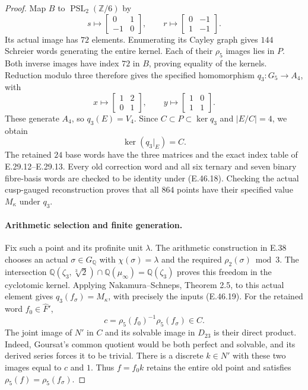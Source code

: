 \begin{proof}
Map $B$ to $\operatorname{PSL}_2(\mathbb Z/6)$ by
\[
 s\longmapsto\begin{bmatrix}0&1\\-1&0\end{bmatrix},\qquad
 r\longmapsto\begin{bmatrix}0&-1\\1&-1\end{bmatrix}.
 \tag{E.46.18}
\]
Its actual image has $72$ elements.  Enumerating its Cayley
graph gives $144$ Schreier words generating the entire kernel.
Each of their $\rho_5$ images lies in $P$.
Both inverse images have index $72$ in $B$, proving equality
of the kernels.  Reduction modulo three therefore gives
the specified homomorphism $q_3:G_5\to A_4$, with
\[
 x\longmapsto\begin{bmatrix}1&2\\0&1\end{bmatrix},\qquad
 y\longmapsto\begin{bmatrix}1&0\\1&1\end{bmatrix}.
 \tag{E.46.19}
\]
These generate $A_4$, so $q_3(E)=V_4$.  Since
$C\subset P\subset\ker q_3$ and $|E/C|=4$, we obtain
\[
                         \ker(q_3|_E)=C.
 \tag{E.46.20}
\]
The retained $24$ base words have the three matrices and
the exact index table of E.29.12--E.29.13.
Every old correction word and all six ternary and seven
binary fibre-basis words are checked to be identity under
\textup{(E.46.18)}.  Checking the actual cusp-gauged
reconstruction proves that all $864$ points have their
specified value $M_\kappa$ under $q_3$.

\paragraph{Arithmetic selection and finite generation.}
Fix such a point and its profinite unit $\lambda$.
The arithmetic construction in E.38 chooses an actual
$\sigma\in G_{\mathbb Q}$ with $\chi(\sigma)=\lambda$
and the required $\rho_2(\sigma)\bmod3$.
The intersection
$\mathbb Q(\zeta_3,\sqrt[3]{2})\cap\mathbb Q(\mu_\infty)
=\mathbb Q(\zeta_3)$ proves this freedom in the cyclotomic
kernel.  Applying Nakamura--Schneps, Theorem 2.5,
to this actual element gives $q_3(f_\sigma)=M_\kappa$,
with precisely the inputs \textup{(E.46.19)}.
For the retained word $f_0\in\widehat F'$,
\[
                    c=\rho_5(f_0)^{-1}\rho_5(f_\sigma)\in C.
 \tag{E.46.21}
\]
The joint image of $N'$ in $C$ and its solvable image
in $D_{23}$ is their direct product.  Indeed, Goursat's
common quotient would be both perfect and solvable,
and its derived series forces it to be trivial.
There is a discrete $k\in N'$ with these two images
equal to $c$ and $1$.  Thus $f=f_0k$ retains the entire
old point and satisfies $\rho_5(f)=\rho_5(f_\sigma)$.


\end{proof}
